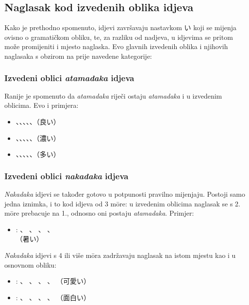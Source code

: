 \subsection{Naglasak kod izvedenih oblika idjeva}
Kako je prethodno spomenuto, idjevi završavaju nastavkom い koji se mijenja ovisno o gramatičkom obliku, te, za razliku od nadjeva, u idjevima se pritom može promijeniti i mjesto naglaska.
Evo glavnih izvedenih oblika i njihovih naglasaka s obzirom na prije navedene kategorije:

\subsubsection*{Izvedeni oblici \textit{atamadaka} idjeva}
Ranije je spomenuto da \textit{atamadaka} riječi ostaju \textit{atamadaka} i u izvedenim oblicima.
Evo i primjera:
\begin{itemize}
	\item {}、、、、、（良い）
	\item {}、、、、、（濃い）
	\item {}、、、、、（多い）
\end{itemize}

\subsubsection*{Izvedeni oblici \textit{nakadaka} idjeva}
\textit{Nakadaka} idjevi se također gotovo u potpunosti pravilno mijenjaju.
Postoji samo jedna iznimka, i to kod idjeva od 3 m\=ore: u izvedenim oblicima naglasak se s 2. m\=ore prebacuje na 1., odnosno oni postaju \textit{atamadaka}.
Primjer:
\begin{itemize}
	\item
	: 
	、
	、
	、
	、
	\\（暑い）
\end{itemize}

\textit{Nakadaka} idjevi s 4 ili više m\=ora zadržavaju naglasak na istom mjestu kao i u osnovnom obliku:
\begin{itemize}
	\item
	: 
	、
	、
	、
	、
	（可愛い）
	\item
	: 
	、
	、
	、
	、
	（面白い）
\end{itemize}

